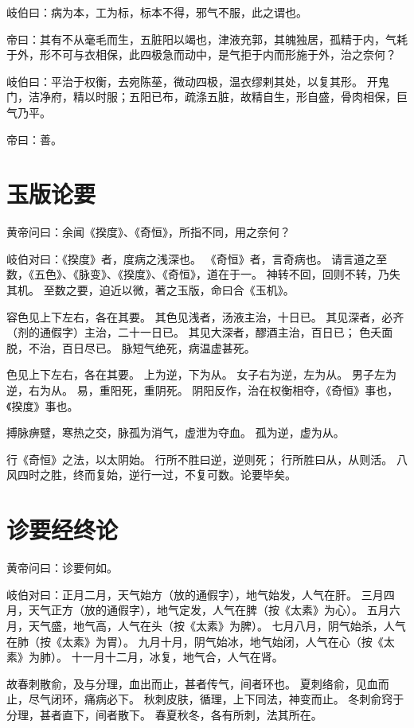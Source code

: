 \documentclass{article}%
\begin{document}
岐伯曰：病为本，工为标，标本不得，邪气不服，此之谓也。

帝曰：其有不从毫毛而生，五脏阳以竭也，津液充郭，其魄独居，孤精于内，气耗于外，形不可与衣相保，此四极急而动中，是气拒于内而形施于外，治之奈何？

岐伯曰：平治于权衡，去宛陈莝，微动四极，温衣缪剌其处，以复其形。
开鬼门，洁净府，精以时服；五阳已布，疏涤五脏，故精自生，形自盛，骨肉相保，巨气乃平。

帝曰：善。


\section{玉版论要}
黄帝问曰：余闻《揆度》、《奇恒》，所指不同，用之奈何？

岐伯对曰：《揆度》者，度病之浅深也。
《奇恒》者，言奇病也。
请言道之至数，《五色》、《脉变》、《揆度》、《奇恒》，道在于一。
神转不回，回则不转，乃失其机。
至数之要，迫近以微，著之玉版，命曰合《玉机》。

容色见上下左右，各在其要。
其色见浅者，汤液主治，十日已。
其见深者，必齐（剂的通假字）主治，二十一日已。
其见大深者，醪酒主治，百日已；
色夭面脱，不治，百日尽已。
脉短气绝死，病温虚甚死。

色见上下左右，各在其要。
上为逆，下为从。
女子右为逆，左为从。
男子左为逆，右为从。
易，重阳死，重阴死。
阴阳反作，治在权衡相夺，《奇恒》事也，《揆度》事也。

搏脉痹躄，寒热之交，脉孤为消气，虚泄为夺血。
孤为逆，虚为从。

行《奇恒》之法，以太阴始。
行所不胜曰逆，逆则死；
行所胜曰从，从则活。
八风四时之胜，终而复始，逆行一过，不复可数。论要毕矣。


\section{诊要经终论}
黄帝问曰：诊要何如。

岐伯对曰：正月二月，天气始方（放的通假字），地气始发，人气在肝。
三月四月，天气正方（放的通假字），地气定发，人气在脾（按《太素》为心）。
五月六月，天气盛，地气高，人气在头（按《太素》为脾）。
七月八月，阴气始杀，人气在肺（按《太素》为胃）。
九月十月，阴气始冰，地气始闭，人气在心（按《太素》为肺）。
十一月十二月，冰复，地气合，人气在肾。

故春刺散俞，及与分理，血出而止，甚者传气，间者环也。
夏刺络俞，见血而止，尽气闭环，痛病必下。
秋刺皮肤，循理，上下同法，神变而止。
冬刺俞窍于分理，甚者直下，间者散下。
春夏秋冬，各有所刺，法其所在。
\end{document}
